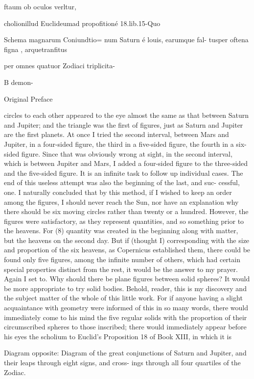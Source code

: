 \documentclass{article}
\begin{document}
{{{{{{{{{{{ftaum ob oculos verltur,{cholionillud Euclideumad propofitioné 18.lib.15-Quo

Schema magnarum Coniundtio=
num Saturn é louis, earumque fal-
tusper oftena figna , arquetranfitus

per omnes quatuor Zodiaci triplicita-

B demon-


Original Preface

circles to each other appeared to the eye almost the same as that between Saturn
and Jupiter; and the triangle was the first of figures, just as Saturn and Jupiter
are the first planets. At once I tried the second interval, between Mars and
Jupiter, in a four-sided figure, the third in a five-sided figure, the fourth in a six-
sided figure. Since that was obviously wrong at sight, in the second interval,
which is between Jupiter and Mars, I added a four-sided figure to the three-sided
and the five-sided figure. It is an infinite task to follow up individual cases.
The end of this useless attempt was also the beginning of the last, and suc-
cessful, one. I naturally concluded that by this method, if I wished to keep an
order among the figures, I should never reach the Sun, nor have an explanation
why there should be six moving circles rather than twenty or a hundred. However,
the figures were satisfactory, as they represent quantities, and so something prior
to the heavens. For (8) quantity was created in the beginning along with matter,
but the heavens on the second day. But if (thought I) corresponding with the size
and proportion of the six heavens, as Copernicus established them, there could be
found only five figures, among the infinite number of others, which had certain
special properties distinct from the rest, it would be the answer to my prayer.
Again I set to. Why should there be plane figures between solid spheres? It would
be more appropriate to try solid bodies. Behold, reader, this is my discovery and
the subject matter of the whole of this little work. For if anyone having a slight
acquaintance with geometry were informed of this in so many words, there would
immediately come to his mind the five regular solids with the proportion of their
circumscribed spheres to those inscribed; there would immediately appear before
his eyes the scholium to Euclid’s Proposition 18 of Book XIII, in which it is

Diagram opposite:
Diagram of the great conjunctions of Saturn and Jupiter, and their leaps through eight signs, and cross-
ings through all four quartiles of the Zodiac.

}}}}}}}}}}}}
\end{document}
